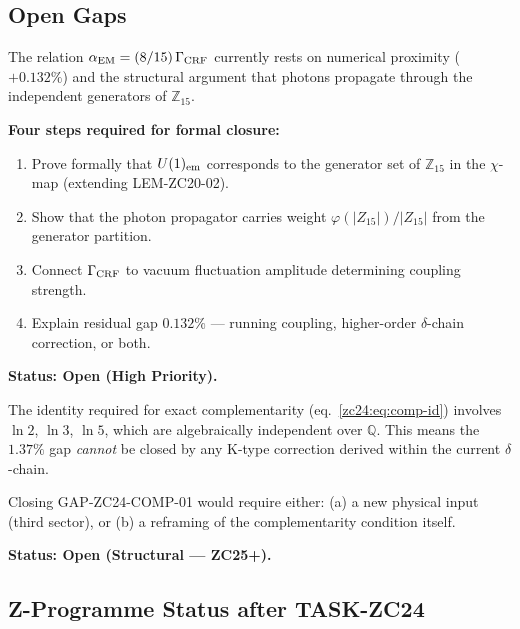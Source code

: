 \documentclass[12pt, a4paper]{article}
\begin{document}
\subsection{Open Gaps}
\label{zc24:sec:gaps}

\begin{openqbox}[title={GAP-ZC24-ALPHA-01: Formal Derivation of
  $\alpha_{\rm EM} = (8/15)\,\Gamma_{\rm CRF}$ (Critical)}]
The relation $\alpha_{\rm EM} = (8/15)\,\Gamma_{\rm CRF}$ currently
rests on numerical proximity ($+0.132\%$) and the structural
argument that photons propagate through the independent generators
of $\mathbb{Z}_{15}$.

\textbf{Four steps required for formal closure:}
\begin{enumerate}[leftmargin=*, noitemsep]
  \item Prove formally that $U(1)_{\rm em}$ corresponds to the
    generator set of $\mathbb{Z}_{15}$ in the $\chi$-map
    (extending LEM-ZC20-02).
  \item Show that the photon propagator carries weight
    $\varphi(|Z_{15}|)/|Z_{15}|$ from the generator partition.
  \item Connect $\Gamma_{\rm CRF}$ to vacuum fluctuation amplitude
    determining coupling strength.
  \item Explain residual gap $0.132\%$ --- running coupling,
    higher-order $\delta$-chain correction, or both.
\end{enumerate}
\textbf{Status: Open (High Priority).}
\end{openqbox}

\begin{openqbox}[title={GAP-ZC24-COMP-01: Transcendental
  Complementarity Gap (Structural)}]
The identity required for exact complementarity
(eq.~\eqref{zc24:eq:comp-id}) involves $\ln 2$, $\ln 3$, $\ln 5$,
which are algebraically independent over $\mathbb{Q}$.
This means the $1.37\%$ gap \emph{cannot} be closed by any
K-type correction derived within the current $\delta$-chain.

Closing GAP-ZC24-COMP-01 would require either:
(a) a new physical input (third sector), or
(b) a reframing of the complementarity condition itself.

\textbf{Status: Open (Structural --- ZC25+).}
\end{openqbox}

\subsection{Z-Programme Status after TASK-ZC24}
\label{zc24:sec:status}
\end{document}
